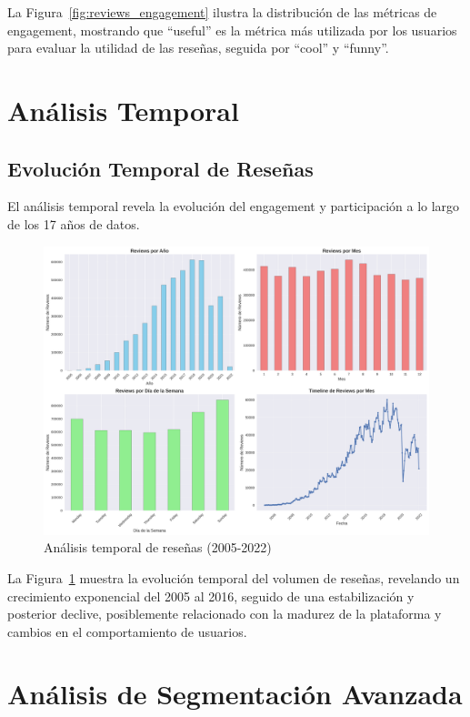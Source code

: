 \documentclass[12pt,a4paper,twoside,openany]{book}
\begin{document}
La Figura~\ref{fig:reviews_engagement} ilustra la distribución de las métricas de engagement, mostrando que ``useful'' es la métrica más utilizada por los usuarios para evaluar la utilidad de las reseñas, seguida por ``cool'' y ``funny''.

\section{Análisis Temporal}

\subsection{Evolución Temporal de Reseñas}

El análisis temporal revela la evolución del engagement y participación a lo largo de los 17 años de datos.

\begin{figure}[H]
\centering
\includegraphics[width=1.0\textwidth]{figures/reviews_temporal_analysis.png}
\caption{Análisis temporal de reseñas (2005-2022)}
\label{fig:reviews_temporal_analysis}
\end{figure}

La Figura~\ref{fig:reviews_temporal_analysis} muestra la evolución temporal del volumen de reseñas, revelando un crecimiento exponencial del 2005 al 2016, seguido de una estabilización y posterior declive, posiblemente relacionado con la madurez de la plataforma y cambios en el comportamiento de usuarios.

\section{Análisis de Segmentación Avanzada}
\end{document}
